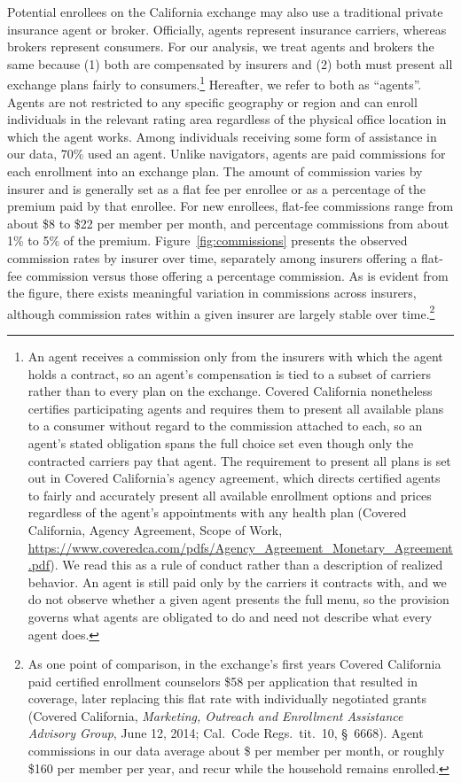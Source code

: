 \documentclass[12pt]{article}
\begin{document}
Potential enrollees on the California exchange may also use a traditional private insurance agent or broker. Officially, agents represent insurance carriers, whereas brokers represent consumers. For our analysis, we treat agents and brokers the same because (1) both are compensated by insurers and (2) both  must present all exchange plans fairly to consumers.\footnote{An agent receives a commission only from the insurers with which the agent holds a contract, so an agent's compensation is tied to a subset of carriers rather than to every plan on the exchange. Covered California nonetheless certifies participating agents and requires them to present all available plans to a consumer without regard to the commission attached to each, so an agent's stated obligation spans the full choice set even though only the contracted carriers pay that agent.  The requirement to present all plans is set out in Covered California's agency agreement, which directs certified agents to fairly and accurately present all available enrollment options and prices regardless of the agent's appointments with any health plan (Covered California, Agency Agreement, Scope of Work, \url{https://www.coveredca.com/pdfs/Agency_Agreement_Monetary_Agreement.pdf}). We read this as a rule of conduct rather than a description of realized behavior. An agent is still paid only by the carriers it contracts with, and we do not observe whether a given agent presents the full menu, so the provision governs what agents are obligated to do and need not describe what every agent does.}  Hereafter, we refer to both as ``agents''.   Agents are not restricted to any specific geography or region and can enroll individuals in the relevant rating area regardless of the physical office location in which the agent works. Among individuals receiving some form of assistance in our data, 70\% used an agent.  Unlike navigators, agents are paid commissions for each enrollment into an exchange plan. The amount of commission varies by insurer and is generally set as a flat fee per enrollee or as a percentage of the premium paid by that enrollee. For new enrollees, flat-fee commissions range from about \$8 to \$22 per member per month, and percentage commissions from about 1\% to 5\% of the premium. Figure~\ref{fig:commissions} presents the observed commission rates by insurer over time, separately among insurers offering a flat-fee commission versus those offering a percentage commission. As is evident from the figure, there exists meaningful variation in commissions across insurers, although commission rates within a given insurer are largely stable over time.\footnote{As one point of comparison, in the exchange's first years Covered California paid certified enrollment counselors \$58 per application that resulted in coverage, later replacing this flat rate with individually negotiated grants (Covered California, \textit{Marketing, Outreach and Enrollment Assistance Advisory Group}, June 12, 2014; Cal.\ Code Regs.\ tit.\ 10, \S~6668). Agent commissions in our data average about \$\meanCommission{} per member per month, or roughly \$160 per member per year, and recur while the household remains enrolled.}
\end{document}
